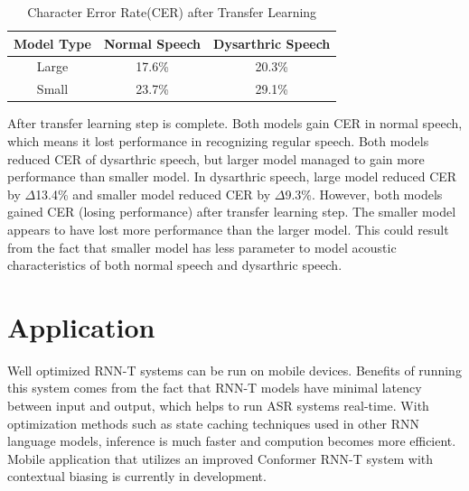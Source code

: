 \documentclass[9pt,final,a4paper]{IEEEtran}
\begin{document}
\begin{table}[ht]
    \caption*{Character Error Rate(CER) after Transfer Learning}
    \vspace*{-3mm}
    \begin{center}
        \begin{tabular}{|c|c|c|}
            \hline
            Model Type & Normal Speech & Dysarthric Speech \\ [0.5ex] 
            \hline\hline
            Large & 17.6\% & 20.3\% \\ 
            \hline
            Small & 23.7\% & 29.1\% \\
            \hline
        \end{tabular}
    \end{center}
\end{table}

After transfer learning step is complete. Both models gain CER in normal speech, which means it lost performance in recognizing regular speech.
Both models reduced CER of dysarthric speech, but larger model managed to gain more performance than smaller model.
In dysarthric speech, large model reduced CER by $\Delta$13.4\% and smaller model reduced CER by $\Delta$9.3\%.
However, both models gained CER (losing performance) after transfer learning step.
The smaller model appears to have lost more performance than the larger model.
This could result from the fact that smaller model has less parameter to model acoustic characteristics of both normal speech and dysarthric speech.


\section{Application}

Well optimized RNN-T systems can be run on mobile devices.
Benefits of running this system comes from the fact that RNN-T models have minimal latency between input and output, which helps to run ASR systems real-time.
With optimization methods such as state caching techniques used in other RNN language models, inference is much faster and compution becomes more efficient\cite{cite1}.
Mobile application that utilizes an improved Conformer RNN-T system with contextual biasing is currently in development.

\begin{figure}[H]
    \centering
\end{figure}
\end{document}
